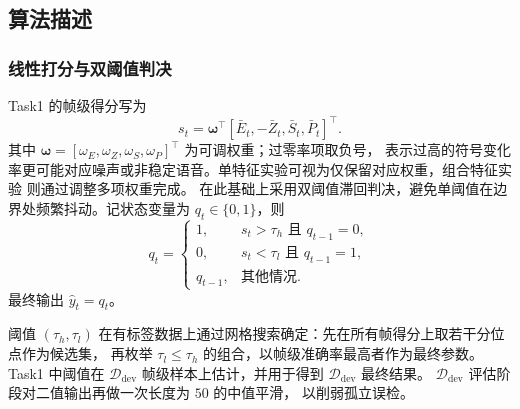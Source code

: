 \documentclass[a4paper]{article}
\begin{document}


\subsection{算法描述}

\subsubsection{线性打分与双阈值判决}

Task1 的帧级得分写为
\begin{equation}
  s_t 
  = \boldsymbol{\omega}^{\top}
  [\bar{E}_t,-\bar{Z}_t,\bar{S}_t,\bar{P}_t]^{\top}.
\end{equation}
其中 $\boldsymbol{\omega}=[\omega_E,\omega_Z,\omega_S,\omega_P]^\top$ 为可调权重；过零率项取负号，
表示过高的符号变化率更可能对应噪声或非稳定语音。单特征实验可视为仅保留对应权重，组合特征实验
则通过调整多项权重完成。
在此基础上采用双阈值滞回判决，避免单阈值在边界处频繁抖动。记状态变量为 $q_t \in \{0,1\}$，则
\begin{equation}
q_t=
\begin{cases}
1, & s_t>\tau_h \text{ 且 } q_{t-1}=0,\\
0, & s_t<\tau_l \text{ 且 } q_{t-1}=1,\\
q_{t-1}, & \text{其他情况}.
\end{cases}
\end{equation}
最终输出 $\hat{y}_t=q_t$。

阈值 $(\tau_h,\tau_l)$ 在有标签数据上通过网格搜索确定：先在所有帧得分上取若干分位点作为候选集，
再枚举 $\tau_l \le \tau_h$ 的组合，以帧级准确率最高者作为最终参数。Task1 中阈值在
$\mathcal{D}_{\text{dev}}$ 帧级样本上估计，并用于得到 $\mathcal{D}_{\text{dev}}$ 最终结果。
$\mathcal{D}_{\text{dev}}$ 评估阶段对二值输出再做一次长度为 $50$ 的中值平滑，
以削弱孤立误检。
\end{document}
